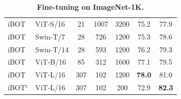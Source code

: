 \documentclass{article} %
\def\ourmethod{{iBOT}\xspace}
\begin{document}
\begin{table}[tbp]
\begin{minipage}[c]{.52\linewidth}
{{\begin{tabular}{llccccc}
\rowcolor{cyan!50}
\ourmethod & ViT-S/16 & 21 & 1007 & 3200 & 75.2 & 77.9 \\
\rowcolor{cyan!50}
\ourmethod & Swin-T/7 & 28 & 726 & 1200 & 75.3 & 78.6 \\
\rowcolor{cyan!50}
\ourmethod & Swin-T/14 & 28 & 593 & 1200 & 76.2 & 79.3 \\
\rowcolor{cyan!50}
\ourmethod & ViT-B/16 & 85 & 312 & 1600 & 77.1 & 79.5 \\
\rowcolor{cyan!50}
\ourmethod & ViT-L/16 & 307 & 102 & 1200 & \bf 78.0 & 81.0 \\
\rowcolor{cyan!50}
\ourmethod$^\ddag$ & ViT-L/16 & 307 & 102 & 200 & 72.9 & \bf 82.3 \\
\bottomrule
\end{tabular}}}
\end{minipage}%
\hspace{0.18cm}
\begin{minipage}[c]{.48\linewidth}
\captionsetup{width=.9\linewidth}
\caption{\textbf{Fine-tuning on ImageNet-1K.}}
\label{tab:transfer}
\vspace{-0.2cm}
\centering
{}
\end{minipage}
\end{table}
\end{document}
